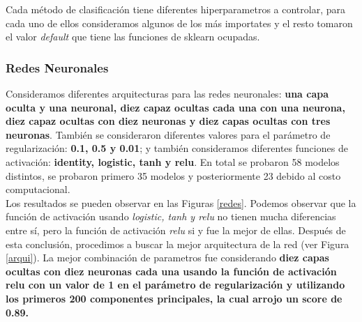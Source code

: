 \documentclass[paper=letter, fontsize=11pt]{scrartcl}
\numberwithin{equation}{section} %
\numberwithin{figure}{section} %
\numberwithin{table}{section} %
\begin{document}
Cada método de clasificación tiene diferentes hiperparametros a controlar, para cada uno de ellos consideramos algunos de los más importates y el resto tomaron el valor \textit{default} que tiene las funciones de sklearn \cite{scikit-learn} ocupadas.

\subsubsection*{Redes Neuronales}
Consideramos diferentes arquitecturas para las redes neuronales: \textbf{una capa oculta y una neuronal, diez capaz ocultas cada una con una neurona, diez capaz ocultas con diez neuronas y diez capas ocultas con tres neuronas}. También se consideraron diferentes valores para el parámetro de regularización: \textbf{0.1, 0.5 y 0.01}; y también consideramos diferentes funciones de activación: \textbf{identity, logistic, tanh y relu}. En total se probaron 58 modelos distintos, se probaron primero 35 modelos y posteriormente 23 debido al costo computacional.\\

Los resultados se pueden observar en las Figuras \ref{redes}. Podemos observar que la función de activación usando \textit{logistic, tanh y relu} no tienen mucha diferencias entre sí, pero la función de activación \textit{relu} si y fue la mejor de ellas. Después de esta conclusión, procedimos a buscar la mejor arquitectura de la red (ver Figura \ref{arqui}). La mejor combinación de parametros fue considerando \textbf{diez capas ocultas con diez neuronas cada una usando la función de activación relu con un valor de 1 en el parámetro de regularización y utilizando los primeros 200 componentes principales, la cual arrojo un score de 0.89.}
\end{document}
